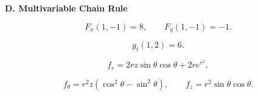 \documentclass[10pt]{article}
\newcommand{\answerbar}[1]{%
  \vspace{0.30em}%
  \noindent\colorbox{sectiongray}{%
    \parbox{\dimexpr\textwidth-2\fboxsep\relax}{%
      \strut\textbf{#1}\strut
    }%
  }%
  \par\vspace{0.30em}%
}
\begin{document}

\answerbar{D. Multivariable Chain Rule}

\begin{parts}

\item
\[
\boxed{F_x(1,-1)=8},
\qquad
\boxed{F_y(1,-1)=-1}.
\]

\item
\[
\boxed{g_t(1,2)=6}.
\]

\item
\[
\boxed{
f_r
=
2rz\sin\theta\cos\theta
+
2re^{r^2}
},
\]

\[
\boxed{
f_\theta
=
r^2z(\cos^2\theta-\sin^2\theta)
},
\qquad
\boxed{
f_z
=
r^2\sin\theta\cos\theta
}.
\]

\end{parts}
\end{document}
